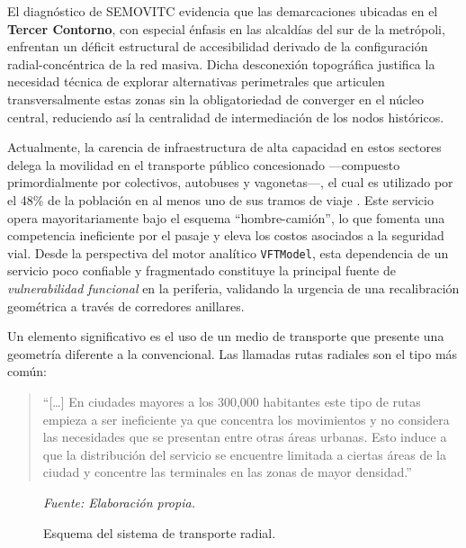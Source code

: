 El diagnóstico de SEMOVITC evidencia que las demarcaciones ubicadas en el \textbf{Tercer Contorno}, 
con especial énfasis en las alcaldías del sur de la metrópoli, enfrentan un déficit estructural de 
accesibilidad derivado de la configuración radial-concéntrica de la red masiva. 
Dicha desconexión topográfica justifica la necesidad técnica de explorar alternativas perimetrales 
que articulen transversalmente estas zonas sin la obligatoriedad de converger en el núcleo central, 
reduciendo así la centralidad de intermediación de los nodos históricos. 

Actualmente, la carencia de infraestructura de alta capacidad en estos sectores delega la movilidad 
en el transporte público concesionado ---compuesto primordialmente por colectivos, autobuses y vagonetas---,
el cual es utilizado por el 48\% de la población en al menos uno de sus tramos de viaje \parencite{semovi2020diagnostico}. 
Este servicio opera mayoritariamente bajo el esquema ``hombre-camión'', lo que fomenta una competencia ineficiente por 
el pasaje y eleva los costos asociados a la seguridad vial. 
Desde la perspectiva del motor analítico \texttt{VFTModel}, esta dependencia de un servicio poco confiable y fragmentado 
constituye la principal fuente de \textit{vulnerabilidad funcional} en la periferia, validando la urgencia 
de una recalibración geométrica a través de corredores anillares.

Un elemento significativo es el uso de un medio de transporte que presente una
geometría diferente a la convencional. Las llamadas rutas radiales son el tipo más
común:

\begin{quote}
``[\ldots] En ciudades mayores a los 300,000 habitantes este tipo de rutas empieza
a ser ineficiente ya que concentra los movimientos y no considera las necesidades
que se presentan entre otras áreas urbanas. Esto induce a que la distribución del
servicio se encuentre limitada a ciertas áreas de la ciudad y concentre las terminales
en las zonas de mayor densidad.'' \parencite[p.~XX]{molinero2002}
\end{quote}

\begin{figure}[htbp]
    \centering
    \caption[Esquema de transporte radial]{Esquema del sistema de transporte radial.}
    \label{fig:transporte-radial}
    \small\textit{Fuente: Elaboración propia.}
\end{figure}

